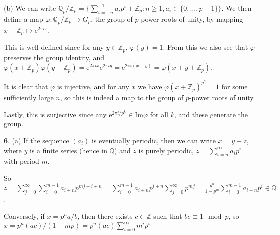 \documentclass[]{article}
\theoremstyle{custhm}
\theoremstyle{cusdef}
\theoremstyle{custhm}
\theoremstyle{custhm}
\theoremstyle{custhm}
\theoremstyle{custhm}
\theoremstyle{cusdef}
\theoremstyle{remark}
\newcommand{\Z}{\mathbb{Z}}
\newcommand{\Q}{\mathbb{Q}}
\newcommand{\e}{\mathrm{e}}
\newcommand{\ra}{\rightarrow}
\renewcommand{\phi}{\varphi}
\begin{document}
(b) We can write $\Q_p/\Z_p = \{\sum_{i=-n}^{-1}a_ip^i + \Z_p:n\ge 1, a_i\in \{0,\dots,p-1\}\}$. We then define a map $\phi:\Q_p/\Z_p\ra G_p$, the group of $p$-power roots of unity, by mapping $x+\Z_p \mapsto \e^{2\pi i x}$.

This is well defined since for any $y \in \Z_p$, $\phi(y) = 1$. From this we also see that $\phi$ preserves the group identity, and $\phi(x+\Z_p)\phi(y+\Z_p) = \e^{2\pi i x}\e^{2\pi i y} = \e^{2\pi i (x+y)} = \phi(x+y+\Z_p)$.

It is clear that $\phi$ is injective, and for any $x$ we have $\phi(x+\Z_p)^{p^n} = 1$ for some sufficiently large $n$, so this is indeed a map to the group of $p$-power roots of unity.

Lastly, this is surjective since any $\e^{2\pi i/p^k}\in \textrm{Im}\phi$ for all $k$, and these generate the group.

\textbf{6}. (a) If the sequence $(a_i)$ is eventually periodic, then we can write $x = y + z$, where $y$ is a finite series (hence in $\Q$) and $z$ is purely periodic, $z = \sum_{i=n}^{\infty}a_ip^i$ with period $m$.

So $z = \sum_{j = 0}^{\infty}\sum_{i=0}^{m-1}a_{i+n}p^{mj+i+n} = \sum_{i=0}^{m-1}a_{i+n}p^{i+n}\sum_{j=0}^{\infty}p^{mj} = \frac{p^n}{1-p^m}\sum_{i=0}^{m-1}a_{i+n}p^{i}\in \Q$.

Conversely, if $x = p^na/b$, then there exists $c\in \Z$ such that $bc\equiv 1\mod p$, so $x = p^n (ac)/(1-mp) = p^n(ac)\sum_{i=0}^{\infty}m^ip^i$
\end{document}
